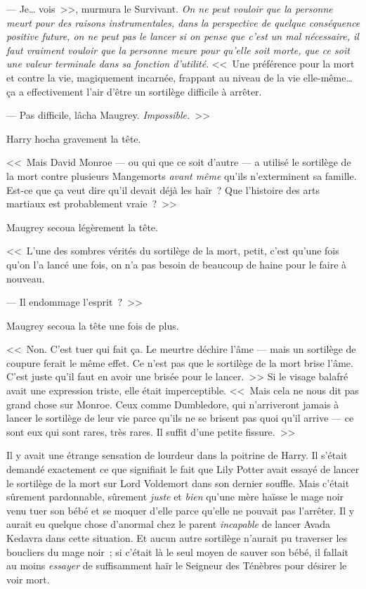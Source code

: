 --- Je… vois~>>, murmura le Survivant. \emph{On ne peut vouloir que la personne meurt pour des raisons instrumentales, dans la perspective de quelque conséquence positive future, on ne peut pas le lancer si on pense que c'est un mal nécessaire, il faut vraiment vouloir que la personne meure pour qu'elle soit morte, que ce soit une valeur terminale dans sa fonction d'utilité}. <<~Une préférence pour la mort et contre la vie, magiquement incarnée, frappant au niveau de la vie elle-même… ça a effectivement l'air d'être un sortilège difficile à arrêter.

--- Pas difficile, lâcha Maugrey. \emph{Impossible.}~>>

Harry hocha gravement la tête.

<<~Mais David Monroe — ou qui que ce soit d'autre — a utilisé le sortilège de la mort contre plusieurs Mangemorts \emph{avant même} qu'ils n'exterminent sa famille. Est-ce que ça veut dire qu'il devait déjà les haïr~? Que l'histoire des arts martiaux est probablement vraie~?~>>

Maugrey secoua légèrement la tête.

<<~L'une des sombres vérités du sortilège de la mort, petit, c'est qu'une fois qu'on l'a lancé une fois, on n'a pas besoin de beaucoup de haine pour le faire à nouveau.

--- Il endommage l'esprit~?~>>

Maugrey secoua la tête une fois de plus.

<<~Non. C'est tuer qui fait ça. Le meurtre déchire l'âme — mais un sortilège de coupure ferait le même effet. Ce n'est pas que le sortilège de la mort brise l'âme. C'est juste qu'il faut en avoir une brisée pour le lancer.~>> Si le visage balafré avait une expression triste, elle était imperceptible. <<~Mais cela ne nous dit pas grand chose sur Monroe. Ceux comme Dumbledore, qui n'arriveront jamais à lancer le sortilège de leur vie parce qu'ils ne se brisent pas quoi qu'il arrive — ce sont eux qui sont rares, très rares. Il suffit d'une petite fissure.~>>

Il y avait une étrange sensation de lourdeur dans la poitrine de Harry. Il s'était demandé exactement ce que signifiait le fait que Lily Potter avait essayé de lancer le sortilège de la mort sur Lord Voldemort dans son dernier souffle. Mais c'était sûrement pardonnable, sûrement \emph{juste} et \emph{bien} qu'une mère haïsse le mage noir venu tuer son bébé et se moquer d'elle parce qu'elle ne pouvait pas l'arrêter. Il y aurait eu quelque chose d'anormal chez le parent \emph{incapable} de lancer Avada Kedavra dans cette situation. Et aucun autre sortilège n'aurait pu traverser les boucliers du mage noir~; si c'était là le seul moyen de sauver son bébé, il fallait au moins \emph{essayer} de suffisamment haïr le Seigneur des Ténèbres pour désirer le voir mort.

